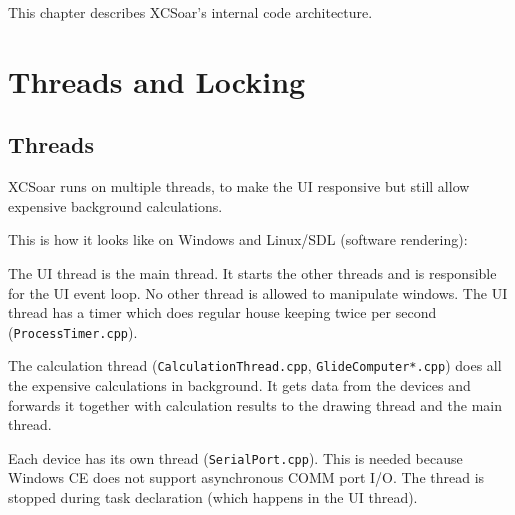 \documentclass[a4paper,12pt]{refrep}
\begin{document}
This chapter describes XCSoar's internal code architecture.

\section{Threads and Locking}

\subsection{Threads}

XCSoar runs on multiple threads, to make the UI responsive but still
allow expensive background calculations.

This is how it looks like on Windows and Linux/SDL (software
rendering):


The UI thread is the main thread.  It starts the other threads and is
responsible for the UI event loop.  No other thread is allowed to
manipulate windows.  The UI thread has a timer which does regular
house keeping twice per second (\texttt{Pro\-cess\-Ti\-mer.cpp}).

The calculation thread (\texttt{Calcu\-la\-tion\-Thread.cpp},
\texttt{Glide\-Com\-pu\-ter*.cpp}) does all the expensive calculations in
background.  It gets data from the devices and forwards it together
with calculation results to the drawing thread and the main thread.

Each device has its own thread (\texttt{Serial\-Port.cpp}).  This is
needed because Windows CE does not support asynchronous COMM port I/O.
The thread is stopped during task declaration (which happens in the UI
thread).
\end{document}
